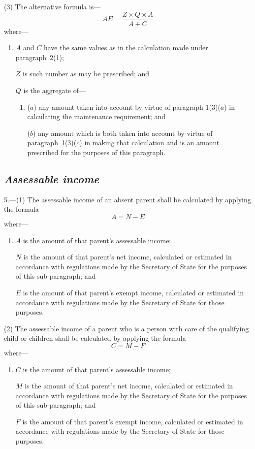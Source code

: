 \documentclass[12pt,a4paper]{article}
\begin{document}
(3) The alternative formula is—
\[
AE = \frac{Z \times Q \times A}{A + C}
\]
where—
\begin{enumerate}\item[]
    $A$ and $C$ have the same values as in the calculation made under paragraph~2(1);

    $Z$ is such number as may be prescribed; and

    $Q$ is the aggregate of— 
\begin{enumerate}\item[]
($a$) any amount taken into account by virtue of paragraph 1(3)($a$)  in calculating the maintenance requirement; and

($b$) any amount which is both taken into account by virtue of paragraph~1(3)($c$)  in making that calculation and is an amount prescribed for the purposes of this paragraph.
\end{enumerate}
\end{enumerate}


\subsection*{\itshape Assessable income}

5.---(1) The assessable income of an absent parent shall be calculated by applying the formula—
\[
A = N - E
\]
where—
\begin{enumerate}\item[]
    $A$ is the amount of that parent’s assessable income;

    $N$ is the amount of that parent’s net income, calculated or estimated in accordance with regulations made by the Secretary of State for the purposes of this sub-paragraph; and

    $E$ is the amount of that parent’s exempt income, calculated or estimated in accordance with regulations made by the Secretary of State for those purposes. 
\end{enumerate}

(2) The assessable income of a parent who is a person with care of the qualifying child or children shall be calculated by applying the formula—
\[
C = M - F
\]
where—
\begin{enumerate}\item[]
    $C$ is the amount of that parent’s assessable income;

    $M$ is the amount of that parent’s net income, calculated or estimated in accordance with regulations made by the Secretary of State for the purposes of this sub-paragraph; and

    $F$ is the amount of that parent’s exempt income, calculated or estimated in accordance with regulations made by the Secretary of State for those purposes. 
\end{enumerate}
\end{document}
